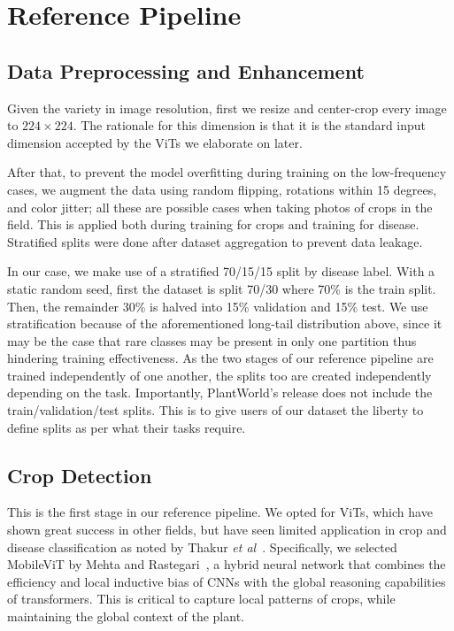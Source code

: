 \documentclass{bmvc2k}
\def\etal{\emph{et al}\bmvaOneDot}
\begin{document}
\section{Reference Pipeline}
\label{sec:method}

\subsection{Data Preprocessing and Enhancement}
Given the variety in image resolution, first we resize and center-crop every image to $224 \times 224$. The rationale for this dimension is that it is the standard input dimension accepted by the ViTs we elaborate on later.

After that, to prevent the model overfitting during training on the low-frequency cases, we augment the data using random flipping, rotations within 15 degrees, and color jitter; all these are possible cases when taking photos of crops in the field. This is applied both during training for crops and training for disease. Stratified splits were done after dataset aggregation to prevent data leakage.

 In our case, we make use of a stratified 70/15/15 split by disease label. With a static random seed, first the dataset is split 70/30 where 70\% is the train split. Then, the remainder 30\% is halved into 15\% validation and 15\% test. We use stratification because of the aforementioned long-tail distribution above, since it may be the case that rare classes may be present in only one partition thus hindering training effectiveness. As the two stages of our reference pipeline are trained independently of one another, the splits too are created independently depending on the task. Importantly, PlantWorld's release does not include the train/validation/test splits. This is to give users of our dataset the liberty to define splits as per what their tasks require.

\subsection{Crop Detection}

This is the first stage in our reference pipeline. We opted for ViTs, which have shown great success in other fields, but have seen limited application in crop and disease classification as noted by Thakur \etal~\cite{thakur2022plantvit}. Specifically, we selected MobileViT by Mehta and Rastegari~\cite{mehta2022}, a hybrid neural network that combines the efficiency and local inductive bias of CNNs with the global reasoning capabilities of transformers. This is critical to capture local patterns of crops, while maintaining the global context of the plant.
\end{document}
